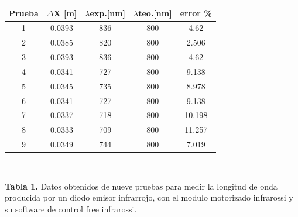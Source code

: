\documentclass[12]{article}
\begin{document}
\begin{multicols}{2}
\begin{center}
\begin{tabular}{|c|c|c|c|c|} 
\hline
\bf{Prueba} & \textbf{$\Delta$X [m]} & \bf{$\lambda$exp.[nm]} & \bf{$\lambda$teo.[nm]} & \bf{error  \%} \\
\hline
 1 & 0.0393 & 836 & 800 & 4.62\\
\hline
 2 & 0.0385 & 820 & 800 & 2.506\\
\hline
 3 & 0.0393 & 836 & 800 & 4.62\\
\hline 
 4 & 0.0341 & 727 & 800 & 9.138\\
\hline
5 & 0.0345 & 735 & 800 & 8.978\\
\hline
6 & 0.0341 & 727 & 800 & 9.138\\
\hline
7 & 0.0337 & 718 & 800 & 10.198\\
\hline
8 & 0.0333 & 709 & 800 & 11.257\\
\hline
9 & 0.0349 & 744 & 800 & 7.019\\
\hline
\end{tabular}
\\
\end{center}
\textbf{Tabla 1.} Datos obtenidos de nueve pruebas para medir la longitud de onda producida por un diodo emisor infrarrojo, con el modulo motorizado infrarossi y su software de control free infrarossi. 

\end{multicols}
\end{document}
